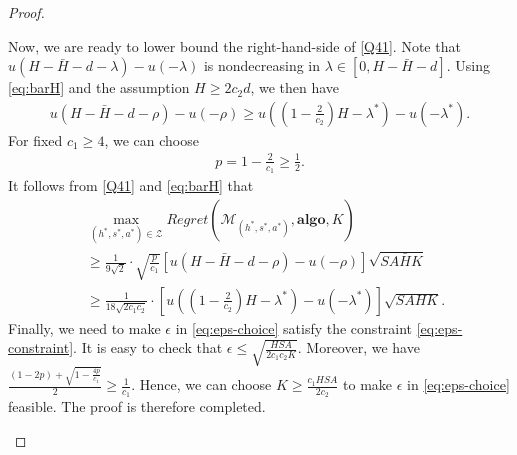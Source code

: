 \documentclass[11pt]{article}
\newcommand{\1}{\mathbbm{1}}
\begin{document}
\begin{proof}
\begin{itemize}
Now, we are ready to lower bound the right-hand-side of \eqref{Q41}. Note that 
$ u(H-\bar{H}-d-\lambda) - u(-\lambda)$ is nondecreasing in $\lambda\in [0,H-\bar{H}-d]$. Using \eqref{eq:barH} and the assumption $H\geq 2c_2 d$,
we then have
\begin{align}
u(H-\bar{H}-d-\rho)-u(-\rho) \ge u \left(\left(1-\frac{2}{c_2}\right)H-\lambda^*\right) - u(-\lambda^*).  
\end{align}
For fixed $c_1 \ge 4$, we can choose 
\begin{align}
p = 1 - \frac{2}{c_1} \ge \frac{1}{2}.
\end{align}
It follows from \eqref{Q41} and \eqref{eq:barH} that 
\begin{align}
&\mathop{\max}_{(h^*,s^*,a^*) \in \mathcal{Z} } Regret(\mathcal{M}_{(h^*,s^*,a^*)},\textbf{algo},K)\nonumber\\
& \ge \frac{1}{9\sqrt{2}}\cdot \sqrt{\frac{p}{c_1}}[u(H-\bar{H}-d-\rho)-u(-\rho)]\sqrt{SA\bar{H}K} \nonumber \\
&\geq \frac{1}{18\sqrt{2c_1 c_2}}\cdot \left[u\left(\left(1-\frac{2}{c_2}\right) H-\lambda^*\right)-u(-\lambda^*)\right]\sqrt{SAHK}.
\end{align}
Finally, we need to make $\epsilon$ in \eqref{eq:eps-choice} satisfy the constraint \eqref{eq:eps-constraint}. It is easy to check that  $\epsilon \leq \sqrt{\frac{HSA}{2c_1 c_2 K}}$. Moreover, we have $\frac{(1-2p)+\sqrt{1-\frac{4p}{c_1}}}{2}\geq \frac{1}{c_1}$. Hence, we can choose $K\geq \frac{c_1 HSA}{2c_2}$ to make 
 $\epsilon$ in \eqref{eq:eps-choice} feasible. The proof is therefore completed. 

\end{itemize}



\end{proof}
\end{document}
